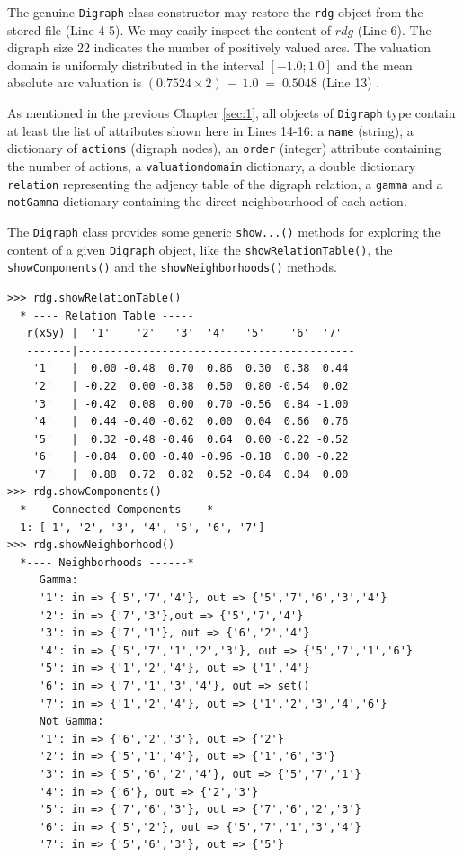 The genuine {\tt Digraph} class constructor may restore the \texttt{rdg} object from the stored file (Line 4-5). We may easily inspect the content of $rdg$ (Line 6). The digraph size 22 indicates the number of positively valued arcs. The valuation domain is uniformly distributed in the interval $[-1.0; 1.0]$ and the mean absolute arc valuation is $(0.7524 \times 2)\, -\, 1.0 \;=\; 0.5048$ (Line 13) .

As mentioned in the previous Chapter \ref{sec:1}, all objects of {\tt Digraph} type contain at least the list of attributes shown here in Lines 14-16: a \texttt{name} (string), a dictionary of \texttt{actions} (digraph nodes), an \texttt{order} (integer) attribute containing the number of actions, a \texttt{valuationdomain} dictionary, a double dictionary \texttt{relation} representing the adjency table of the digraph relation, a \texttt{gamma} and a {\tt notGamma} dictionary containing the direct neighbourhood of each action.

The {\tt Digraph} class provides some generic {\tt show...()} methods for exploring the content of a given {\tt Digraph} object, like the \texttt{showRelationTable()}, the \texttt{showComponents()} and the \texttt{showNeighborhoods()} methods.
\begin{lstlisting}[caption={Example of random valuation digraph},label=list:2.2]
>>> rdg.showRelationTable()
  * ---- Relation Table -----
   r(xSy) |  '1'    '2'   '3'  '4'   '5'    '6'  '7'	  
   -------|-------------------------------------------
    '1'   |  0.00 -0.48  0.70  0.86  0.30  0.38  0.44	 
    '2'   | -0.22  0.00 -0.38  0.50  0.80 -0.54  0.02	 
    '3'   | -0.42  0.08  0.00  0.70 -0.56  0.84 -1.00	 
    '4'   |  0.44 -0.40 -0.62  0.00  0.04  0.66  0.76	 
    '5'   |  0.32 -0.48 -0.46  0.64  0.00 -0.22 -0.52	 
    '6'   | -0.84  0.00 -0.40 -0.96 -0.18  0.00 -0.22	 
    '7'   |  0.88  0.72  0.82  0.52 -0.84  0.04  0.00
>>> rdg.showComponents()
  *--- Connected Components ---*
  1: ['1', '2', '3', '4', '5', '6', '7']
>>> rdg.showNeighborhood()
  *---- Neighborhoods ------*
     Gamma:
     '1': in => {'5','7','4'}, out => {'5','7','6','3','4'}
     '2': in => {'7','3'},out => {'5','7','4'}
     '3': in => {'7','1'}, out => {'6','2','4'}
     '4': in => {'5','7','1','2','3'}, out => {'5','7','1','6'}
     '5': in => {'1','2','4'}, out => {'1','4'}
     '6': in => {'7','1','3','4'}, out => set()
     '7': in => {'1','2','4'}, out => {'1','2','3','4','6'}
     Not Gamma:
     '1': in => {'6','2','3'}, out => {'2'}
     '2': in => {'5','1','4'}, out => {'1','6','3'}
     '3': in => {'5','6','2','4'}, out => {'5','7','1'}
     '4': in => {'6'}, out => {'2','3'}
     '5': in => {'7','6','3'}, out => {'7','6','2','3'}
     '6': in => {'5','2'}, out => {'5','7','1','3','4'}
     '7': in => {'5','6','3'}, out => {'5'}
\end{lstlisting}   

